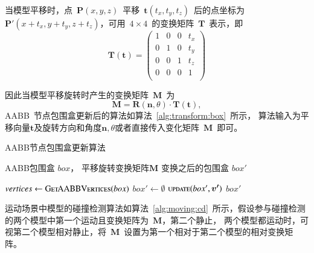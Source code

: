 当模型平移时，点~$\bm{P}(x, y, z)$~平移~$\bm{t}(t_x, t_y, t_z)$~后的点坐标为~$\bm{P}'(x+t_x, y+t_y, z+t_z)$，可用~$4 \times 4$~的变换矩阵~$\bm{T}$~表示，即
\begin{equation}
  \bm{T}(\bm{t}) =
  \begin{pmatrix}
    1 & 0 & 0 & t_x \\
    0 & 1 & 0 & t_y \\
    0 & 0 & 1 & t_z \\
    0 & 0 & 0 & 1 \\
  \end{pmatrix}
  \label{equa:translate:matrix}
\end{equation}

因此当模型平移旋转时产生的变换矩阵~$\bm{M}$~为
\begin{equation}
\bm{M}=\bm{R}(\bm{n}, \theta) \cdot \bm{T}(\bm{t}),
\label{equa:transform:matrix}
\end{equation}
AABB~节点包围盒更新后的算法如算法~\ref{alg:transform:box}~所示，
算法输入为平移向量$\bm{t}$及旋转方向和角度$\bm{n}, \theta$或者直接传入变化矩阵~$\bm{M}$~即可。

\begin{algorithm}[htbp]
\small
\caption{AABB节点包围盒更新算法}
\label{alg:transform:box}
\begin{algorithmic}[1]
\Require
AABB包围盒 $box$，
平移旋转变换矩阵$\bm{M}$
\Ensure
变换之后的包围盒 $box'$

    \State $vertices \gets \Call{GetAABBVertices}{box}$ 
    \State $box' \gets \emptyset$
     
         
        \State $\Call{update}{box', \bm{v'}}$ 
    \EndFor
    \State \Return $box'$
\EndFunction
\end{algorithmic}
\end{algorithm}

运动场景中模型的碰撞检测算法如算法~\ref{alg:moving:cd}~所示，假设参与碰撞检测的两个模型中第一个运动且变换矩阵为~$\bm{M}$，第二个静止，
两个模型都运动时，可视第二个模型相对静止，将~$\bm{M}$~设置为第一个相对于第二个模型的相对变换矩阵。


